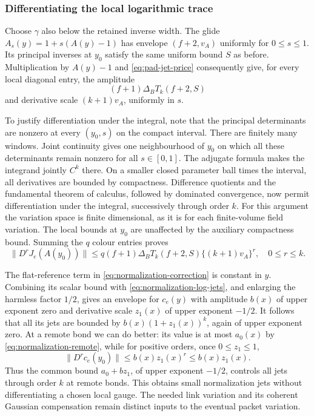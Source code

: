\subsubsection{Differentiating the local logarithmic trace}
Choose $\gamma$ also below the retained inverse width. The glide
$A_s(y)=1+s(A(y)-1)$ has envelope $(f+2,v_A)$ uniformly for
$0\le s\le1$. Its principal inverses at $y_0$ satisfy the same
uniform bound $S$ as before. Multiplication by $A(y)-1$ and
\eqref{eq:pad-jet-price} consequently give, for every local diagonal
entry, the amplitude
\[
 (f+1)\Delta_BT_k(f+2,S)
\]
and derivative scale $(k+1)v_A$, uniformly in $s$.

To justify differentiation under the integral, note that the
principal determinants are nonzero at every $(y_0,s)$ on the compact
interval. There are finitely many windows. Joint continuity gives
one neighbourhood of $y_0$ on which all these determinants remain
nonzero for all $s\in[0,1]$. The adjugate formula makes the integrand
jointly $C^k$ there. On a smaller closed parameter ball times the
interval, all derivatives are bounded by compactness. Difference
quotients and the fundamental theorem of calculus, followed by
dominated convergence, now permit differentiation under the integral,
successively through order $k$. For this argument the variation space
is finite dimensional, as it is for each finite-volume field variation.
The local bounds at $y_0$ are unaffected by the auxiliary compactness
bound. Summing the $q$ colour entries proves
\begin{equation}\label{eq:normalization-log-jets}
 \|D^rJ_e(A(y_0))\|
 \le q(f+1)\Delta_BT_k(f+2,S)\{(k+1)v_A\}^r,
 \quad0\le r\le k.
\end{equation}

The flat-reference term in \eqref{eq:normalization-correction} is
constant in $y$. Combining its scalar bound with
\eqref{eq:normalization-log-jets}, and enlarging the harmless factor
$1/2$, gives an envelope for $c_e(y)$ with amplitude $b(x)$ of upper
exponent zero and derivative scale $z_1(x)$ of upper exponent $-1/2$.
It follows that all its jets are bounded by
$b(x)(1+z_1(x))^k$, again of upper exponent zero. At a remote bond
we can do better: its value is at most $a_0(x)$ by
\eqref{eq:normalization-remote}, while for positive orders, once
$0\le z_1\le1$,
\[
 \|D^r c_e(y_0)\|\le b(x)z_1(x)^r\le b(x)z_1(x).
\]
Thus the common bound $a_0+bz_1$, of upper exponent $-1/2$, controls
all jets through order $k$ at remote bonds. This obtains small
normalization jets without differentiating a chosen local gauge.
The needed link variation and its coherent Gaussian compensation
remain distinct inputs to the eventual packet variation.
